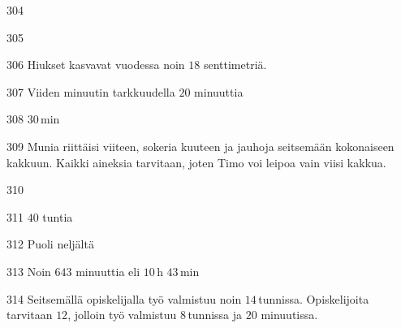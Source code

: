 \begin{Vastaus}{304}
    
\end{Vastaus}
\begin{Vastaus}{305}
	
\end{Vastaus}
\begin{Vastaus}{306}
Hiukset kasvavat vuodessa noin $18$ senttimetriä.
	
\end{Vastaus}
\begin{Vastaus}{307}
Viiden minuutin tarkkuudella $20$ minuuttia
	
\end{Vastaus}
\begin{Vastaus}{308}
        $30$\,min
    
\end{Vastaus}
\begin{Vastaus}{309}
Munia riittäisi viiteen, sokeria kuuteen ja jauhoja seitsemään kokonaiseen kakkuun. Kaikki aineksia tarvitaan, joten Timo voi leipoa vain viisi kakkua.
	
\end{Vastaus}
\begin{Vastaus}{310}
	
\end{Vastaus}
\begin{Vastaus}{311}
		$40$ tuntia
	
\end{Vastaus}
\begin{Vastaus}{312}
Puoli neljältä
	
\end{Vastaus}
\begin{Vastaus}{313}
        Noin $643$ minuuttia eli $10$\,h $43$\,min
    
\end{Vastaus}
\begin{Vastaus}{314}
Seitsemällä opiskelijalla työ valmistuu noin $14$\,tunnissa. Opiskelijoita tarvitaan $12$, jolloin työ valmistuu $8$\,tunnissa ja $20$ minuutissa.
	
\end{Vastaus}
